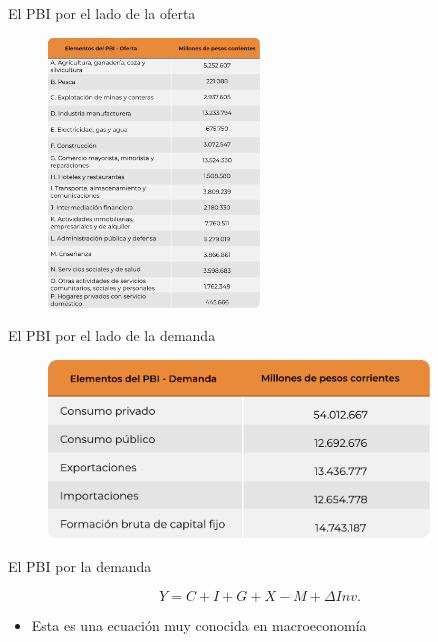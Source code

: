 \documentclass{beamer}
\begin{document}
\begin{frame}{El PBI por el lado de la oferta}

\begin{figure} [h!]
    \centering
    \includegraphics[width=0.5\textwidth]{Slides Principios de Economia/Figures/T 29.3.pdf}
\end{figure}

\end{frame}

\begin{frame}{El PBI por el lado de la demanda}

\begin{figure} [h!]
    \centering
    \includegraphics[width=0.9\textwidth]{Slides Principios de Economia/Figures/T 29.2.pdf}
\end{figure}

\end{frame}

\begin{frame}{El PBI por la demanda}
    
  \begin{equation}
        Y= C + I + G + X - M +  \Delta Inv.
  \end{equation}
  \begin{itemize}
  \item Esta es una ecuación muy conocida en macroeconomía
  \end{itemize}
\end{frame}
\end{document}
